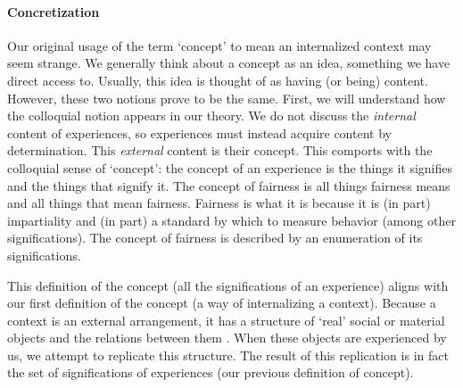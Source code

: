 \paragraph{Concretization}
Our original usage of the term `concept' to mean an internalized context may seem strange. We generally think about a concept as an idea, something we have direct access to. Usually, this idea is thought of as having (or being) content. However, these two notions prove to be the same. First, we will understand how the colloquial notion appears in our theory. We do not discuss the \textit{internal} content of experiences, so experiences must instead acquire content by determination. This \textit{external} content is their concept. This comports with the colloquial sense of `concept': the concept of an experience is the things it signifies and the things that signify it. The concept of fairness is all things fairness means and all things that mean fairness. Fairness is what it is because it is (in part) impartiality and (in part) a standard by which to measure behavior (among other significations). The concept of fairness is described by an enumeration of its significations.


This definition of the concept (all the significations of an experience) aligns with our first definition of the concept (a way of internalizing a context).
Because a context is an external arrangement, it has a structure of `real' social or material objects and the relations between them \citep{Millikan:BeyondConcepts}. When these objects are experienced by us, we attempt to replicate this structure. The result of this replication is in fact the set of significations of experiences (our previous definition of concept).


